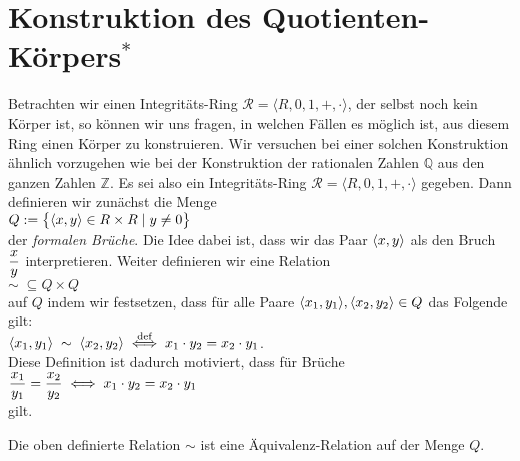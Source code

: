 \section{Konstruktion des Quotienten-K\"{o}rpers$^*$}
Betrachten wir einen Integrit\"{a}ts-Ring $\mathcal{R} = \langle R, 0, 1, +, \cdot \rangle$, der selbst noch
kein K\"{o}rper ist, so k\"{o}nnen wir uns fragen, in welchen F\"{a}llen es m\"{o}glich ist, aus diesem
Ring einen K\"{o}rper zu konstruieren.  Wir versuchen bei einer solchen Konstruktion \"{a}hnlich
vorzugehen wie bei der Konstruktion der rationalen Zahlen $\mathbb{Q}$ aus den ganzen
Zahlen $\mathbb{Z}$.  Es sei also ein Integrit\"{a}ts-Ring $\mathcal{R} = \langle R, 0, 1, +, \cdot \rangle$
gegeben.  Dann definieren wir zun\"{a}chst die Menge
\\[0.2cm]
\hspace*{1.3cm}
$Q := \bigl\{ \pair(x,y) \in R \times R \mid y \not= 0 \bigr\}$
\\[0.2cm]
der {\color{blue}\emph{formalen Br\"{u}che}}.  Die Idee dabei ist, dass wir das Paar
$\pair(x,y)$ als den Bruch $\displaystyle\frac{x}{y}$ interpretieren.  Weiter definieren wir eine Relation 
\\[0.2cm]
\hspace*{1.3cm}
$\sim \;\subseteq Q \times Q$
\\[0.2cm]
auf $Q$ indem wir festsetzen, dass f\"{u}r alle Paare $\pair(x_1,y_1), \pair(x_2,y_2) \in Q$ das Folgende gilt:
\\[0.2cm]
\hspace*{1.3cm}
$\pair(x_1, y_1) \;\sim\; \pair(x_2, y_2) \df x_1 \cdot y_2 = x_2 \cdot y_1$.
\\[0.2cm]
Diese Definition ist dadurch motiviert, dass f\"{u}r Br\"{u}che 
\\[0.2cm]
\hspace*{1.3cm}
$\displaystyle \frac{x_1}{y_1} = \frac{x_2}{y_2} \;\Longleftrightarrow\; x_1 \cdot y_2 = x_2 \cdot y_1$
\\[0.2cm]
gilt.

\begin{Satz}
Die oben definierte Relation  $\sim$ ist eine \"{A}quivalenz-Relation auf der Menge $Q$.
\end{Satz}

